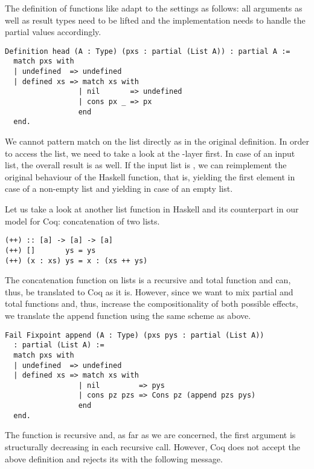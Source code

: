 The definition of  functions like  adapt to the settings as follows: all arguments as well as result types need to be lifted and the implementation needs to handle the partial values accordingly.

\begin{verbatim}
Definition head (A : Type) (pxs : partial (List A)) : partial A :=
  match pxs with
  | undefined  => undefined
  | defined xs => match xs with
                 | nil       => undefined
                 | cons px _ => px
                 end
  end.
\end{verbatim}

We cannot pattern match on the list directly as in the original definition.
In order to access the list, we need to take a look at the \--layer first.
In case of an  input list, the overall result is  as well.
If the input list is , we can reimplement the original behaviour of the Haskell function, that is, yielding the first element in case of a non\--empty list and yielding  in case of an empty list.

Let us take a look at another list function in Haskell and its counterpart in our model for Coq: concatenation of two lists.

\begin{verbatim}
(++) :: [a] -> [a] -> [a]
(++) []       ys = ys
(++) (x : xs) ys = x : (xs ++ ys)
\end{verbatim}

The concatenation function on lists is a recursive and total function and can, thus, be translated to Coq as it is.
However, since we want to mix partial and total functions and, thus, increase the compositionality of both possible effects, we translate the append function using the same scheme as above.

\begin{verbatim}
Fail Fixpoint append (A : Type) (pxs pys : partial (List A))
  : partial (List A) :=
  match pxs with
  | undefined  => undefined
  | defined xs => match xs with
                 | nil         => pys
                 | cons pz pzs => Cons pz (append pzs pys)
                 end
  end.
\end{verbatim}

The function  is recursive and, as far as we are concerned, the first argument is structurally decreasing in each
recursive call.
However, Coq does not accept the above definition and rejects its with the following message.

